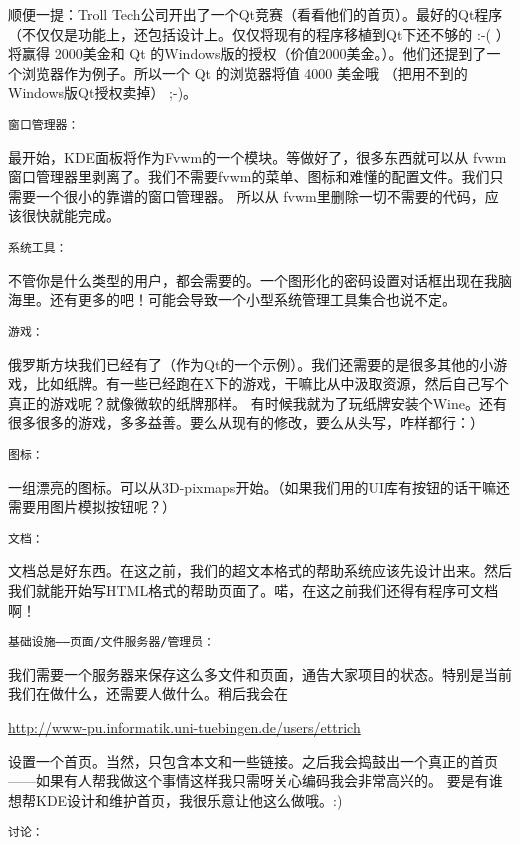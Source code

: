 \begin{insertnote}
{    顺便一提：Troll Tech公司开出了一个Qt竞赛（看看他们的首页）。最好的Qt程序（不仅仅是功能上，还包括设计上。仅仅将现有的程序移植到Qt下还不够的 :-( ）将赢得 2000美金和 Qt 的Windows版的授权（价值2000美金。）。他们还提到了一个浏览器作为例子。所以一个 Qt 的浏览器将值 4000 美金哦 （把用不到的 Windows版Qt授权卖掉） ;-)。


{ \noindent \tt 窗口管理器：}

    最开始，KDE面板将作为Fvwm的一个模块。等做好了，很多东西就可以从 fvwm 窗口管理器里剥离了。我们不需要fvwm的菜单、图标和难懂的配置文件。我们只需要一个很小的靠谱的窗口管理器。
    所以从 fvwm里删除一切不需要的代码，应该很快就能完成。


{ \noindent \tt 系统工具：}

    不管你是什么类型的用户，都会需要的。一个图形化的密码设置对话框出现在我脑海里。还有更多的吧！可能会导致一个小型系统管理工具集合也说不定。
    

{ \noindent \tt 游戏：}

    俄罗斯方块我们已经有了（作为Qt的一个示例）。我们还需要的是很多其他的小游戏，比如纸牌。有一些已经跑在X下的游戏，干嘛比从中汲取资源，然后自己写个真正的游戏呢？就像微软的纸牌那样。
    有时候我就为了玩纸牌安装个Wine。还有很多很多的游戏，多多益善。要么从现有的修改，要么从头写，咋样都行：）
    
{ \noindent \tt 图标：}

    一组漂亮的图标。可以从3D-pixmaps开始。（如果我们用的UI库有按钮的话干嘛还需要用图片模拟按钮呢？）
    
{ \noindent \tt 文档：}

	文档总是好东西。在这之前，我们的超文本格式的帮助系统应该先设计出来。然后我们就能开始写HTML格式的帮助页面了。喏，在这之前我们还得有程序可文档啊！

{ \noindent \tt 基础设施——页面/文件服务器/管理员：}

    我们需要一个服务器来保存这么多文件和页面，通告大家项目的状态。特别是当前我们在做什么，还需要人做什么。稍后我会在
    
    	\begin{center}
    	\url{http://www-pu.informatik.uni-tuebingen.de/users/ettrich}
    	\end{center}

设置一个首页。当然，只包含本文和一些链接。之后我会捣鼓出一个真正的首页——如果有人帮我做这个事情这样我只需呀关心编码我会非常高兴的。
要是有谁想帮KDE设计和维护首页，我很乐意让他这么做哦。:)

{ \noindent \tt 讨论：}

}
\end{insertnote}
